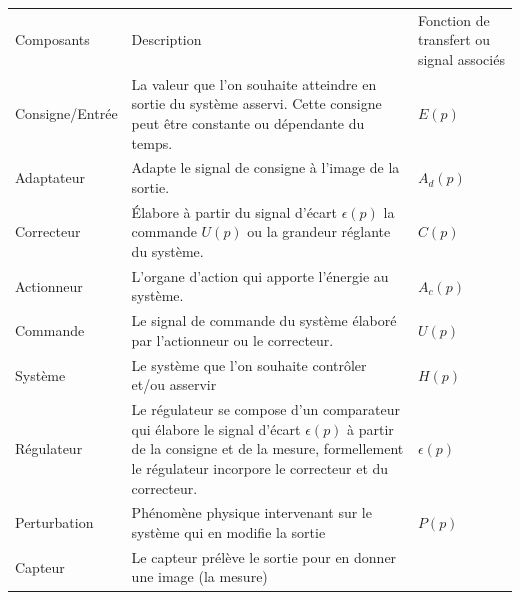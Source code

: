 \begin{table}[!h]
\begin{center}
    \begin{tabular}{M{3cm}M{8cm}M{4cm}}
        \hhline{===}
        Composants      & Description & Fonction de transfert ou signal associés \\[0em]
        \hhline{===}
        Consigne/Entrée & La valeur que l'on souhaite atteindre en sortie du système asservi.
                          Cette consigne peut être constante ou dépendante du temps. 
                        & $E(p)$                                                 \\[0em]
        \hline
        Adaptateur      & Adapte le signal de consigne à l'image de la sortie.           
                        & $A_d(p)$                                               \\[0em]
        \hline
        Correcteur      & \'Elabore à partir du signal d'écart $\epsilon(p)$ 
                          la commande $U(p)$ ou la grandeur réglante du système.
                        & $C(p)$                                                 \\[0em]
        \hline
        Actionneur      & L'organe d'action qui apporte l'énergie au système.
                        & $A_c(p)$                                               \\[0em]
        \hline
		Commande        & Le signal de commande du système élaboré par l'actionneur 
		                  ou le correcteur.
                        & $U(p)$                                                 \\[0em]
        \hline
        Système         & Le système que l'on souhaite contrôler et/ou asservir
                                      & $H(p)$                                   \\[0em]
        \hline
        Régulateur      & Le régulateur se compose d'un comparateur qui élabore le signal d'écart $\epsilon(p)$ 
                          à partir de la consigne et de la mesure, formellement le régulateur incorpore le correcteur 
                          et du correcteur.
                                      & $\epsilon(p)$                            \\[0em]
        \hline
        Perturbation    & Phénomène physique intervenant sur le système qui en modifie la sortie
                                      & $P(p)$                                   \\[0em]
        \hline
        Capteur         &  Le capteur prélève le sortie pour en donner une image (la mesure) 

\end{tabular}
\end{center}
\end{table}

